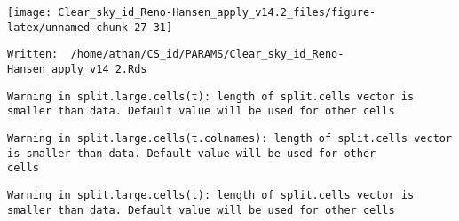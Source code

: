 \documentclass[
  10pt,
  a4paper,oneside]{article}
\newenvironment{Shaded}{\begin{snugshade}}{\end{snugshade}}
\newcommand{\CharTok}[1]{\textcolor[rgb]{0.31,0.60,0.02}{#1}}
\newcommand{\CommentTok}[1]{\textcolor[rgb]{0.56,0.35,0.01}{\textit{#1}}}
\newcommand{\KeywordTok}[1]{\textcolor[rgb]{0.13,0.29,0.53}{\textbf{#1}}}
\newcommand{\NormalTok}[1]{#1}
\newcommand{\OperatorTok}[1]{\textcolor[rgb]{0.81,0.36,0.00}{\textbf{#1}}}
\newcommand{\StringTok}[1]{\textcolor[rgb]{0.31,0.60,0.02}{#1}}
\begin{document}
\begin{center}\texttt{[image: Clear\_sky\_id\_Reno-Hansen\_apply\_v14.2\_files/figure-latex/unnamed-chunk-27-31]} \end{center}

\begin{Shaded}
\end{Shaded}

\begin{verbatim}
Written:  /home/athan/CS_id/PARAMS/Clear_sky_id_Reno-Hansen_apply_v14_2.Rds 
\end{verbatim}

\begin{verbatim}
Warning in split.large.cells(t): length of split.cells vector is smaller than data. Default value will be used for other cells
\end{verbatim}

\begin{verbatim}
Warning in split.large.cells(t.colnames): length of split.cells vector is smaller than data. Default value will be used for other
cells
\end{verbatim}

\begin{verbatim}
Warning in split.large.cells(t): length of split.cells vector is smaller than data. Default value will be used for other cells
\end{verbatim}
\end{document}
